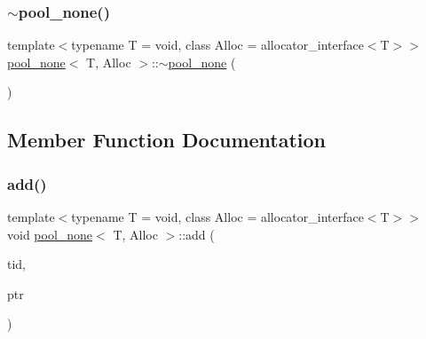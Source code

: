 \mbox{\label{classpool__none_a5469691d9539271b4fa8d5980e1fcb9e}} 
\subsubsection{\texorpdfstring{$\sim$pool\+\_\+none()}{~pool\_none()}}
{\footnotesize\ttfamily template$<$typename T  = void, class Alloc  = allocator\+\_\+interface$<$\+T$>$$>$ \\
\hyperlink{classpool__none}{pool\+\_\+none}$<$ T, Alloc $>$\+::$\sim$\hyperlink{classpool__none}{pool\+\_\+none} (\begin{DoxyParamCaption}{ }\end{DoxyParamCaption})\hspace{0.3cm}{\ttfamily [inline]}}



\subsection{Member Function Documentation}
\mbox{\label{classpool__none_a07c69ce30c2cb27f3ca8e36b3b4c30bb}} 
\subsubsection{\texorpdfstring{add()}{add()}}
{\footnotesize\ttfamily template$<$typename T  = void, class Alloc  = allocator\+\_\+interface$<$\+T$>$$>$ \\
void \hyperlink{classpool__none}{pool\+\_\+none}$<$ T, Alloc $>$\+::add (\begin{DoxyParamCaption}\item[{const int}]{tid,  }\item[{T $\ast$}]{ptr }\end{DoxyParamCaption})\hspace{0.3cm}{\ttfamily [inline]}}

\mbox{\label{classpool__none_a4d773f878fb8e0c11c70b49c73ef24b6}} 
